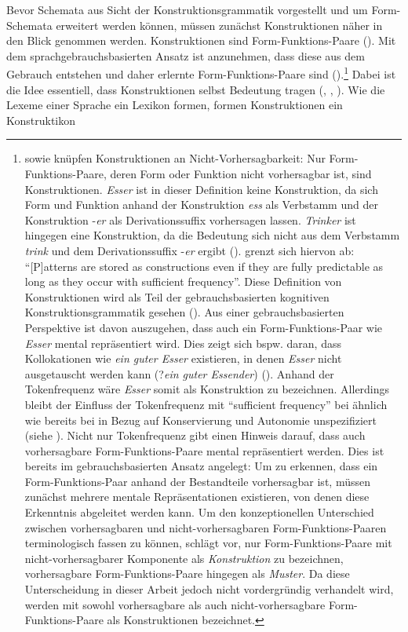 Bevor Schemata aus Sicht der Konstruktionsgrammatik vorgestellt und um Form-Schemata erweitert werden können, müssen zunächst Konstruktionen näher in den Blick genommen werden. Konstruktionen sind Form-Funktions-Paare (\cite[467]{Lakoff.1987}). Mit dem sprachgebrauchsbasierten Ansatz ist anzunehmen, dass diese aus dem Gebrauch entstehen und daher erlernte Form-Funktions-Paare sind (\cite[5]{Goldberg.2006}).\footnote{\textcite[467]{Lakoff.1987} sowie \textcite[205]{Goldberg.1998} knüpfen Konstruktionen an Nicht-Vor\-her\-sag\-bar\-keit: Nur Form-Funktions-Paare, deren Form oder Funktion nicht vorhersagbar ist, sind Konstruktionen. \textit{Esser} ist in dieser Definition keine Konstruktion, da sich Form und Funktion anhand der Konstruktion \textit{ess} als Verbstamm und der Konstruktion -\textit{er} als Derivationssuffix vorhersagen lassen. \textit{Trinker} ist hingegen eine Konstruktion, da die Bedeutung  sich nicht aus dem Verbstamm \textit{trink} und dem Derivationssuffix -\textit{er} ergibt (\cite[185--186]{Stefanowitsch.2011}). \textcite[5]{Goldberg.2006} grenzt sich hiervon ab: "`[P]atterns are stored as constructions even if they are fully predictable as long as they occur with sufficient frequency"'. Diese Definition von Konstruktionen wird als Teil der gebrauchsbasierten kog\-nitiven Konstruktionsgrammatik gesehen (\cite[17]{Boas.2013}). Aus einer gebrauchsbasierten Perspektive ist davon auszugehen, dass auch ein Form-Funktions-Paar wie \textit{Esser} mental repräsentiert wird. Dies zeigt sich bspw. daran, dass Kollokationen wie \textit{ein guter Esser} existieren, in denen \textit{Esser} nicht ausgetauscht  werden kann (?\textit{ein guter Essender}) (\cite[185--186]{Stefanowitsch.2011}). Anhand der Tokenfrequenz wäre \textit{Esser} somit als Konstruktion zu bezeichnen.  Allerdings bleibt der Einfluss der Tokenfrequenz mit "`sufficient frequency"' bei \textcite[5]{Goldberg.2006} ähnlich wie bereits bei \textcite[715]{Bybee.2006b} in Bezug auf Konservierung und Autonomie unspezifiziert (siehe ). Nicht nur Tokenfrequenz gibt einen Hinweis darauf, dass auch vorhersagbare Form-Funktions-Paare mental repräsentiert werden. Dies ist bereits im gebrauchsbasierten Ansatz angelegt: Um zu erkennen, dass ein Form-Funktions-Paar anhand der Bestandteile vorhersagbar ist, müssen zunächst mehrere mentale Repräsentationen existieren, von denen diese Erkenntnis abgeleitet werden kann. Um den konzeptionellen Unterschied zwischen vorhersagbaren und nicht-vorhersagbaren Form-Funktions-Paaren terminologisch fassen zu können, schlägt \textcite[569]{Stefanowitsch.2009} vor, nur Form-Funktions-Paare mit nicht-vorhersagbarer Komponente als \textit{Konstruktion} zu bezeichnen, vorhersagbare Form-Funktions-Paare hingegen als \textit{Muster}. Da diese Unterscheidung in dieser Arbeit jedoch nicht vordergründig verhandelt wird, werden mit \textcite[5]{Goldberg.2006} sowohl vorhersagbare als auch nicht-vorhersagbare Form-Funktions-Paare als Konstruktionen bezeichnet.} Dabei ist die Idee essentiell, dass Konstruktionen selbst Bedeutung tragen (\cite[203--205]{Goldberg.1998}, \cite[56--57]{Ellis.2014}, \cite[34--35]{Goldberg.2019}). Wie die Lexeme einer Sprache ein Lexikon formen, formen Konstruktionen ein Konstruktikon 